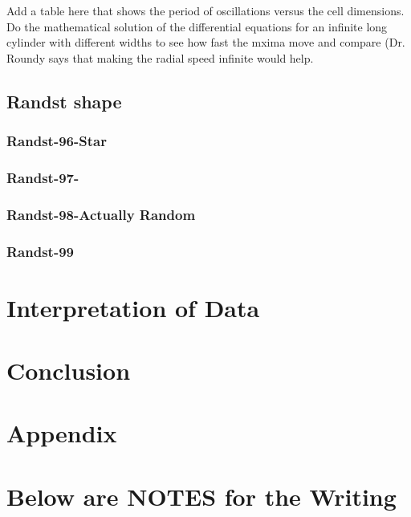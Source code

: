 \documentclass[letterpaper,twocolumn,amsmath,amssymb,pre]{revtex4-1}
\begin{document}
Add a table here that shows the period of oscillations versus the cell
dimensions.  Do the mathematical solution of the differential
equations for an infinite long cylinder with different widths to see
how fast the mxima move and compare (Dr. Roundy says that making the
radial speed infinite would help.


\subsection{Randst shape}
\subsubsection{Randst-96-Star}
\subsubsection{Randst-97-}
\subsubsection{Randst-98-Actually Random}
\subsubsection{Randst-99}
\section{Interpretation of Data}
\section{Conclusion}
\section*{Appendix}












\section{Below are NOTES for the Writing}
\end{document}
